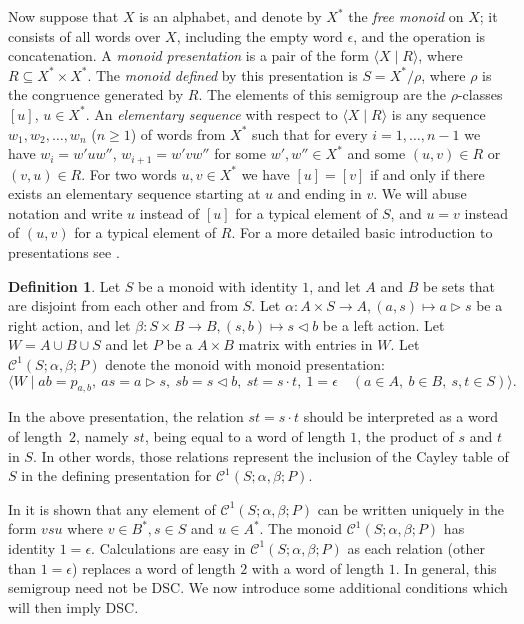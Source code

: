\documentclass[a4paper, 12pt,reqno]{amsart}
\theoremstyle{plain}
\theoremstyle{definition}
\newtheorem{definition}[thm]{Definition}
\theoremstyle{remark}
\newcommand{\CS}{\mathcal{C}^1(S;\alpha,\beta;P)}
\begin{document}
Now suppose that $X$ is an alphabet, and denote by $X^\ast$ the \emph{free monoid} on $X$; it consists of all words over $X$, including the empty word $\epsilon$, and the operation is concatenation. 
A \emph{monoid presentation} is a pair of the form $\langle X\mid R\rangle$, where $R\subseteq X^\ast\times X^\ast$.
The \emph{monoid defined} by this presentation is $S=X^\ast/\rho$, where $\rho$ is the congruence generated by $R$. The elements of this semigroup are the $\rho$-classes $[u]$, $u\in X^\ast$.
An \emph{elementary sequence} with respect to $\langle X\mid R\rangle$ is any sequence 
$w_1,w_2,\dots, w_n$ ($n\geq 1$) of words from $X^\ast$ such that for every $i=1,\dots,n-1$ we
have $w_i=w'uw''$, $w_{i+1}=w'vw''$ for some $w',w''\in X^\ast$ and some $(u,v)\in R$ or $(v,u)\in R$.
For two words $u,v\in X^\ast$ we have $[u]=[v]$ if and only if there exists an elementary sequence starting at $u$ and ending in $v$.
We will abuse notation and write $u$ instead of $[u]$ for a typical element of $S$, and $u=v$ instead of $(u,v)$ for a typical element of $R$.
For a more detailed basic introduction to presentations see \cite[Section 1.6]{Ho95}.

\begin{definition}
    Let $S$ be a monoid with identity $1$, and let $A$ and $B$ be sets that are disjoint from each other and from $S$.
    Let $\alpha \colon  A\times S\rightarrow A, (a,s)\mapsto a\triangleright s$ be a right action, and let $\beta\colon  S \times B \rightarrow B, (s,b) \mapsto s \triangleleft b$ be a left action.
    Let $W = A \cup B \cup S$ and let $P$ be a $A \times B$ matrix with entries in $W$.
    Let $\CS$ denote the monoid with monoid presentation:
    \begin{equation*}
        \bigl\langle W \mid ab = p_{a,b} ,\ as = a \triangleright s ,\ sb = s \triangleleft b ,\ st = s \cdot t ,\ 1 = \epsilon \quad (a \in A ,\ b \in B ,\ s,t \in S) \bigr\rangle.
    \end{equation*}
\end{definition}

In the above presentation, the relation $st=s \cdot t$ should be interpreted as a word of length~$2$, namely $st$, being equal to a word of length $1$, the product of $s$ and $t$ in $S$.
In other words, those relations represent the inclusion of the Cayley table of $S$ in the defining presentation for $\CS$.

In \cite{Byleen} it is shown that any element of $\CS$ can be written uniquely in the form $vsu$ where $v \in B^\ast, s \in S$ and $ u \in A^\ast$. 
The monoid $\CS$ has identity $1 = \epsilon$.  
Calculations are easy in $\CS$ as each relation (other than $1 = \epsilon$) replaces a word of length $2$ with a word of length $1$.
In general, this semigroup need not be DSC. We now introduce some additional conditions which will then imply DSC.
\end{document}
